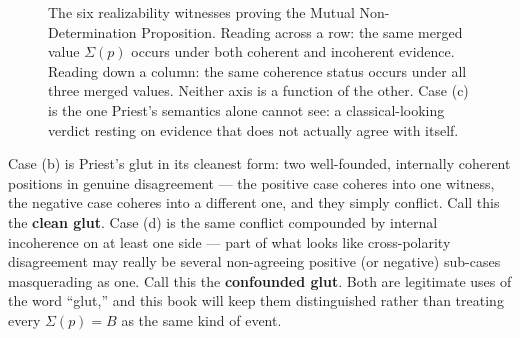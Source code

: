\begin{figure}[htbp]
\centering
{}
\caption{The six realizability witnesses proving the Mutual
Non-Determination Proposition. Reading across a row: the same merged
value $\Sigma(p)$ occurs under both coherent and incoherent evidence.
Reading down a column: the same coherence status occurs under all three
merged values. Neither axis is a function of the other. Case (c) is the
one Priest's semantics alone cannot see: a classical-looking verdict
resting on evidence that does not actually agree with itself.}
\label{fig:mutual-non-determination}
\end{figure}

Case (b) is Priest's glut in its cleanest form: two well-founded,
internally coherent positions in genuine disagreement --- the positive case
coheres into one witness, the negative case coheres into a different one,
and they simply conflict. Call this the \textbf{clean glut}. Case (d) is the
same conflict compounded by internal incoherence on at least one side ---
part of what looks like cross-polarity disagreement may really be several
non-agreeing positive (or negative) sub-cases masquerading as one. Call
this the \textbf{confounded glut}. Both are legitimate uses of the word
``glut,'' and this book will keep them distinguished rather than treating
every \(\Sigma(p)=B\) as the same kind of event.

